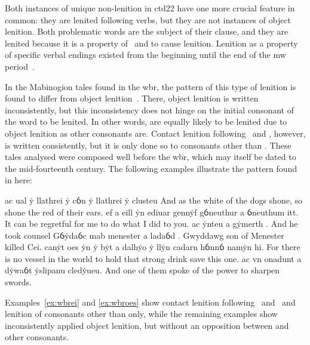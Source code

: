 Both instances of unique non-lenition in \gls{ctd22} have one more crucial feature in common: they are lenited following verbs, but they are not instances of object lenition. Both problematic words are the subject of their clause, and they are lenited because it is a property of \ei\ and  to cause lenition. Lenition as a property of specific verbal endings existed from the beginning until the end of the \gls{mw} period~\autocite[42]{van_development14}.

In the Mabinogion tales found in the \gls{wbr}, the pattern of this type of lenition is found to differ from object lenition~\autocite[42, 69--70]{van_development14}. There, object lenition is written inconsistently, but this inconsistency does not hinge on the initial consonant of the word to be lenited. In other words,  are equally likely to be lenited due to object lenition as other consonants are. Contact lenition following \ei\ and \oes, however, is written consistently, but it is only done so to consonants other than . These tales analysed were composed well before the \gls{wbr}, which may itself be dated to the mid-fourteenth century. The following examples illustrate the pattern found in here:
\begin{mwl}
  {ac ual ẏ llathrei  ẏ cỽn ẏ llathrei  ẏ clusteu}%
  {And as the white of the dogs shone, so shone the red of their ears.}%
  {ef a eill  ẏn ediuar gennẏf gỽneuthur a ỽneuthum itt.}%
  {It can be regretful for me to do what I did to you.}
  {ac ẏnteu a gẏmerth .}%
  {And he took counsel}
  {Gỽẏdaỽc mab menester a ladaỽd .}%
  {Gwyddawg son of Menester killed Cei.}
  {canẏt oes  ẏn ẏ bẏt a dalhẏo ẏ llẏn cadarn hỽnnỽ namẏn hi.}%
  {For there is no vessel in the world to hold that strong drink save this one.}%
  {ac vn onadunt a dẏwaỽt  ẏslipanu cledẏueu.}%
  {And one of them spoke of the power to sharpen swords.}
\end{mwl}
Examples~\ref{ex:wbrei} and \ref{ex:wbroes} show contact lenition following \ei\ and \oes\ and lenition of consonants other than  only, while the remaining examples show inconsistently applied object lenition, but without an opposition between  and other consonants.

